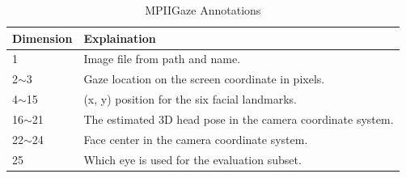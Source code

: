 \documentclass[senior]{IPSstyle}
\begin{document}
\begin{table}[h]
\centering
\begin{tabular}{|l|l|}
\hline
Dimension  & Explaination                                                     \\ \hline
1          & Image file from path and name.                               \\ \hline
2$\sim$3   & Gaze location on the screen coordinate in pixels.           \\ \hline
4$\sim$15  & (x, y) position for the six facial landmarks.                \\ \hline
16$\sim$21 & The estimated 3D head pose in the camera coordinate system. \\ \hline
22$\sim$24 & Face center in the camera coordinate system.                  \\ \hline
25         & Which eye is used for the evaluation subset.                \\ \hline
\end{tabular}
\caption{MPIIGaze Annotations}
\label{table: annotations}
\end{table}
\end{document}
